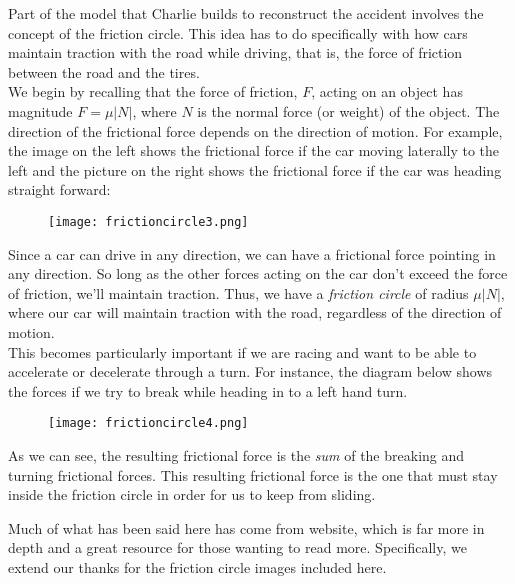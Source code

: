 
Part of the model that Charlie builds to reconstruct the accident involves the concept of the friction circle. This idea has to do specifically with how cars maintain traction with the road while driving, that is, the force of friction between the road and the tires. \\

We begin by recalling that the force of friction, $F$, acting on an object has magnitude $F=\mu |N|$, where $N$ is the normal force (or weight) of the object. The direction of the frictional force depends on the direction of motion. For example, the image on the left shows the frictional force if the car moving laterally to the left and the picture on the right shows the frictional force if the car was heading straight forward:

\begin{figure}[H]
   \centering
   \texttt{[image: frictioncircle3.png]} 
\end{figure}

Since a car can drive in any direction, we can have a frictional force pointing in any direction. So long as the other forces acting on the car don't exceed the force of friction, we'll maintain traction. Thus, we have a \emph{friction circle} of radius $\mu |N|$, where our car will maintain traction with the road, regardless of the direction of motion. \\

This becomes particularly important if we are racing and want to be able to accelerate or decelerate through a turn. For instance, the diagram below shows the forces if we try to break while heading in to a left hand turn. 

\begin{figure}[H]
   \centering
   \texttt{[image: frictioncircle4.png]} 
\end{figure}

As we can see, the resulting frictional force is the \emph{sum} of the breaking and turning frictional forces. This resulting frictional force is the one that must stay inside the friction circle in order for us to keep from sliding.

Much of what has been said here has come from  website, which is far more in depth and a great resource for those wanting to read more. Specifically, we extend our thanks for the friction circle images included here.
























